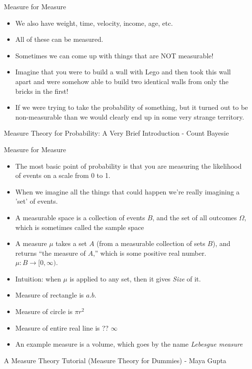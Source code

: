   \begin{frame}[fragile]{Measure for Measure}
\begin{itemize} 
\item We also have weight, time, velocity, income, age, etc.
\item All of these can be measured.
\item Sometimes we can come up with things that are NOT measurable! 
\item Imagine that you were to build a wall with Lego and then took this wall apart and were somehow able to build two identical walls from only the bricks in the first! 
\item If we were trying to take the probability of something, but it turned out to be non-measurable than we would clearly end up in some very strange territory.
\end{itemize}

\tiny{Measure Theory for Probability: A Very Brief Introduction - Count Bayesie}
\end{frame}

  \begin{frame}[fragile]{Measure for Measure}
\begin{itemize} 
\item The most basic point of probability is that you are measuring the likelihood of events on a scale from 0 to 1. 
\item When we imagine all the things that could happen we're really imagining a 'set' of events.
\item A measurable space is a collection of events
$B$, and the set of all outcomes $\Omega$, which is sometimes called the sample space
\item A measure $\mu$ takes a set $A$ (from a measurable collection of sets $B$), and returns ``the measure of $A$,'' which is some positive real number. 
$\mu : B \rightarrow [0,\infty)$. 
\item Intuition: when $\mu$ is applied to any set, then it gives \emph{Size} of it.
\item Measure of rectangle is $a.b$.
\item Measure of circle is $\pi r^2$
\item Measure of entire real line is ?? $\infty$
\item An example measure is a volume, which goes by the name \emph{Lebesgue
measure}
\end{itemize}

\tiny{A Measure Theory Tutorial (Measure Theory for Dummies) - Maya Gupta}
\end{frame}

